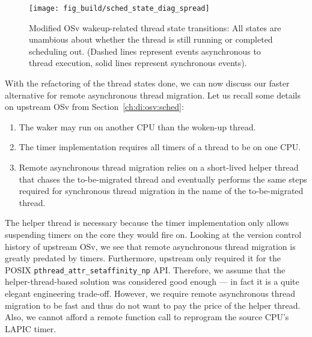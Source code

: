 \documentclass[12pt,a4paper]{book}
\begin{document}
\begin{figure}[H]
    \centering
    \texttt{[image: fig\_build/sched\_state\_diag\_spread]}
    \caption{Modified OSv wakeup-related thread state transitions: All states are unambious about whether the thread is still running or completed scheduling out.
        (Dashed lines represent events asynchronous to thread execution, solid lines represent synchronous events).
    }
    \label{fig:di:wake:spreadstates}
\end{figure}

With the refactoring of the thread states done, we can now discuss our faster alternative for remote asynchronous thread migration.
Let us recall some details on upstream OSv from Section~\ref{ch:di:osv:sched}:
\begin{enumerate}[label=(\alph*)]
    \item The waker may run on another CPU than the woken-up thread.
    \item The timer implementation requires all timers of a thread to be on one CPU.
    \item Remote asynchronous thread migration relies on a short-lived helper thread that chases the to-be-migrated thread and eventually performs the same steps required for synchronous thread migration in the name of the to-be-migrated thread.
\end{enumerate}
The helper thread is necessary because the timer implementation only allows suspending timers on the core they would fire on.
Looking at the version control history of upstream OSv, we see that remote asynchronous thread migration is greatly predated by timers.
Furthermore, upstream only required it for the POSIX \lstinline[style=figurecpp]{pthread_attr_setaffinity_np} API.
Therefore, we assume that the helper-thread-based solution was considered good enough --- in fact it is a quite elegant engineering trade-off.
However, we require remote asynchronous thread migration to be fast and thus do not want to pay the price of the helper thread.
Also, we cannot afford a remote function call to reprogram the source CPU's LAPIC timer.
\end{document}

